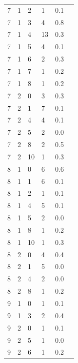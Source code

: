 \documentclass[11pt]{article}
\begin{document}
\begin{tabular}{r|lllll}
	 7   & 1   &  2  &  1  & 0.1\\
	 7   & 1   &  3  &  4  & 0.8\\
	 7   & 1   &  4  & 13  & 0.3\\
	 7   & 1   &  5  &  4  & 0.1\\
	 7   & 1   &  6  &  2  & 0.3\\
	 7   & 1   &  7  &  1  & 0.2\\
	 7   & 1   &  8  &  1  & 0.2\\
	 7   & 2   &  0  &  3  & 0.3\\
	 7   & 2   &  1  &  7  & 0.1\\
	 7   & 2   &  4  &  4  & 0.1\\
	 7   & 2   &  5  &  2  & 0.0\\
	 7   & 2   &  8  &  2  & 0.5\\
	 7   & 2   & 10  &  1  & 0.3\\
	 8   & 1   &  0  &  6  & 0.6\\
	 8   & 1   &  1  &  6  & 0.1\\
	 8   & 1   &  2  &  1  & 0.1\\
	 8   & 1   &  4  &  5  & 0.1\\
	 8   & 1   &  5  &  2  & 0.0\\
	 8   & 1   &  8  &  1  & 0.2\\
	 8   & 1   & 10  &  1  & 0.3\\
	 8   & 2   &  0  &  4  & 0.4\\
	 8   & 2   &  1  &  5  & 0.0\\
	 8   & 2   &  4  &  2  & 0.0\\
	 8   & 2   &  8  &  1  & 0.2\\
	 9   & 1   &  0  &  1  & 0.1\\
	 9   & 1   &  3  &  2  & 0.4\\
	 9   & 2   &  0  &  1  & 0.1\\
	 9   & 2   &  5  &  1  & 0.0\\
	 9   & 2   &  6  &  1  & 0.2\\
\end{tabular}
\end{document}
